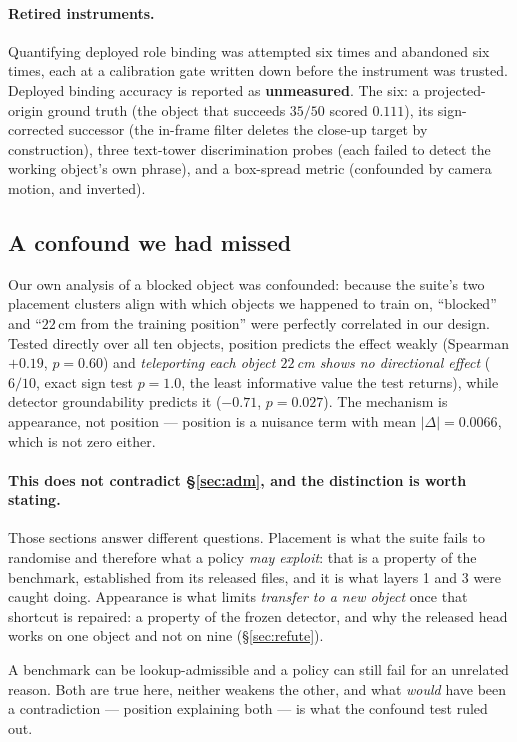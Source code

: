 \documentclass[10pt,twocolumn]{article}
\begin{document}
\paragraph{Retired instruments.} Quantifying deployed role binding was attempted
six times and abandoned six times, each at a calibration gate written down
before the instrument was trusted. Deployed binding accuracy is reported as \textbf{unmeasured}. The six:
a projected-origin ground truth (the object that succeeds $35/50$ scored
$0.111$), its sign-corrected successor (the in-frame filter deletes the
close-up target by construction), three text-tower discrimination probes (each
failed to detect the working object's own phrase), and a box-spread metric
(confounded by camera motion, and inverted).

\subsection{A confound we had missed}
\label{sec:confound}

Our own analysis of a blocked object was confounded: because the suite's two
placement clusters align with which objects we happened to train on,
``blocked'' and ``$22$\,cm from the training position'' were perfectly
correlated in our design. Tested directly over all ten objects, position
predicts the effect weakly (Spearman $+0.19$, $p{=}0.60$) and \emph{teleporting
each object $22$\,cm shows no directional effect} ($6/10$, exact sign test
$p{=}1.0$, the least informative value the test returns), while detector groundability predicts it ($-0.71$, $p{=}0.027$).
The mechanism is appearance, not position --- position is a nuisance term with
mean $|\Delta| = 0.0066$, which is not zero either.

\paragraph{This does not contradict \S\ref{sec:adm}, and the distinction is
worth stating.} Those sections answer different questions. Placement is what the
suite fails to randomise and therefore what a policy \emph{may exploit}: that is
a property of the benchmark, established from its released files, and it is what
layers 1 and 3 were caught doing. Appearance is what limits \emph{transfer to a
new object} once that shortcut is repaired: a property of the frozen detector,
and why the released head works on one object and not on nine
(\S\ref{sec:refute}).

A benchmark can be lookup-admissible and a policy can still fail for an
unrelated reason. Both are true here, neither weakens the other, and what
\emph{would} have been a contradiction --- position explaining both --- is what
the confound test ruled out.
\end{document}
